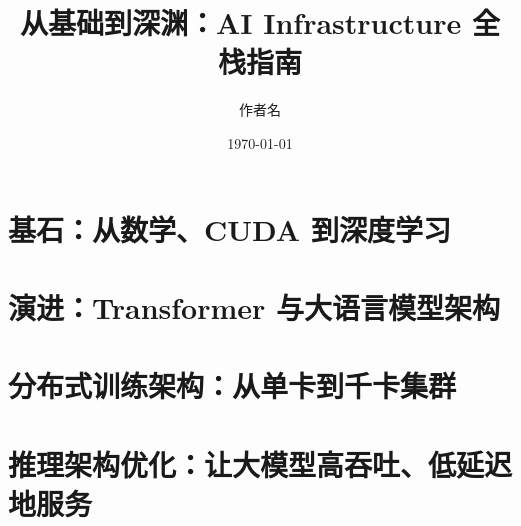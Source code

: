 \documentclass[UTF8,openany,zihao=-4]{ctexbook}
\title{从基础到深渊：AI Infrastructure 全栈指南}
\author{作者名}
\date{\today}
\begin{document}
\frontmatter

\maketitle





\tableofcontents

\mainmatter

\part{基石：从数学、CUDA 到深度学习}





\part{演进：Transformer 与大语言模型架构}





\part{分布式训练架构：从单卡到千卡集群}







\part{推理架构优化：让大模型高吞吐、低延迟地服务}
\end{document}
